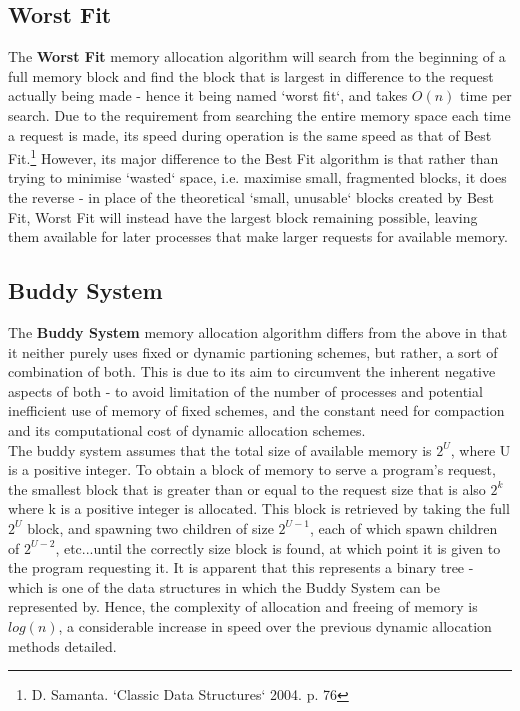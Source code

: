 \documentclass[11pt]{article}
\begin{document}
\subsection{Worst Fit}
The \textbf{Worst Fit} memory allocation algorithm will search from the beginning of a full memory block and find the block that is largest in difference to the request actually being made - hence it being named `worst fit`, and takes $O(n)$ time per search. Due to the requirement from searching the entire memory space each time a request is made, its speed during operation is the same speed as that of Best Fit.\footnote{D. Samanta. `Classic Data Structures` 2004. p. 76} However, its major difference to the Best Fit algorithm is that rather than trying to minimise `wasted` space, i.e. maximise small, fragmented blocks, it does the reverse - in place of the theoretical `small, unusable` blocks created by Best Fit, Worst Fit will instead have the largest block remaining possible, leaving them available for later processes that make larger requests for available memory.

\subsection{Buddy System}
The \textbf{Buddy System} memory allocation algorithm differs from the above in that it neither purely uses fixed or dynamic partioning schemes, but rather, a sort of combination of both. This is due to its aim to circumvent the inherent negative aspects of both - to avoid limitation of the number of processes and potential inefficient use of memory of fixed schemes, and the constant need for compaction and its computational cost of dynamic allocation schemes.\\

The buddy system assumes that the total size of available memory is $2^{U}$, where U is a positive integer. To obtain a block of memory to serve a program's request, the smallest block that is greater than or equal to the request size that is also $2^{k}$ where k is a positive integer is allocated. This block is retrieved by taking the full $2^{U}$ block, and spawning two children of size $2^{U-1}$, each of which spawn children of $2^{U-2}$, etc...until the correctly size block is found, at which point it is given to the program requesting it. It is apparent that this represents a binary tree - which is one of the data structures in which the Buddy System can be represented by. Hence, the complexity of allocation and freeing of memory is $log(n)$, a considerable increase in speed over the previous dynamic allocation methods detailed.\\
\end{document}
